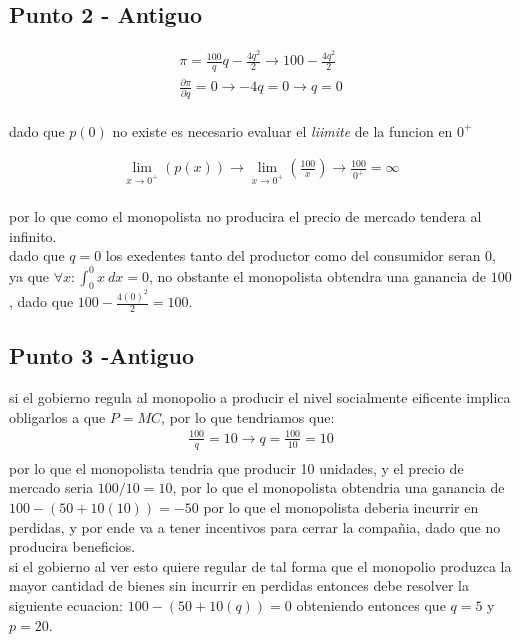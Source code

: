 \documentclass[11pt]{article}
\begin{document}
\subsection{Punto 2 - Antiguo}
\begin{align*}
    \pi = \frac{100}{q}q-\frac{4q^2}{2}\to 100-\frac{4q^2}{2}\\
    \frac{\partial \pi}{\partial q} = 0 \to -4q=0 \to q=0\\
\end{align*}
\begin{flushleft}
    dado que $p(0)$ no existe es necesario evaluar el \textit{liimite} de la funcion en $0^+$
\end{flushleft}
\begin{align*}
    \lim _{x\to 0^+}\left(p(x)\right) \to \lim _{x\to 0^+}\left(\frac{100}{x}\right) \to \frac{100}{0^+}= \infty\\
\end{align*}
\begin{flushleft}
    por lo que como el monopolista no producira el precio de mercado tendera al infinito.\\
    dado que $q=0$ los exedentes tanto del productor como del consumidor seran 0, ya que $ \forall x: \int_{0}^{0}x~dx=0$, no obstante el monopolista obtendra una ganancia de $100$,
    dado que $100-\frac{4(0)^2}{2}=100$.
\end{flushleft}
\subsection{Punto 3 -Antiguo}
\begin{flushleft}
    si el gobierno regula al monopolio a producir el nivel socialmente eificente implica obligarlos a que $P=MC$, por lo que tendriamos que:
    \begin{align*}
        \frac{100}{q}=10 \to q=\frac{100}{10}=10\\
    \end{align*}
    por lo que el monopolista tendria que producir 10 unidades, y el precio de mercado seria $100/10=10$,
    por lo que el monopolista obtendria una ganancia de $100-(50+10(10))=-50$ por lo que el monopolista deberia incurrir en perdidas, y 
    por ende va a tener incentivos para cerrar la compañia, dado que no producira beneficios.\\
    si el gobierno al ver esto quiere regular de tal forma que el monopolio produzca la mayor cantidad de bienes
    sin incurrir en perdidas entonces debe resolver la siguiente ecuacion: $100-(50+10(q))=0$ obteniendo entonces que $q=5$ y $p=20$.
\end{flushleft}
\end{document}
